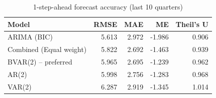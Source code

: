 \begin{table}

\caption{\label{tab:forecast-accuracy}1-step-ahead forecast accuracy (last 10 quarters)}
\centering
\begin{tabular}[t]{lrrrr}
\toprule
Model & RMSE & MAE & ME & Theil's U\\
\midrule
ARIMA (BIC) & 5.613 & 2.972 & -1.986 & 0.906\\
Combined (Equal weight) & 5.822 & 2.692 & -1.463 & 0.939\\
BVAR(2) -- preferred & 5.965 & 2.695 & -1.239 & 0.962\\
AR(2) & 5.998 & 2.756 & -1.283 & 0.968\\
VAR(2) & 6.287 & 2.919 & -1.345 & 1.014\\
\bottomrule
\end{tabular}
\end{table}
